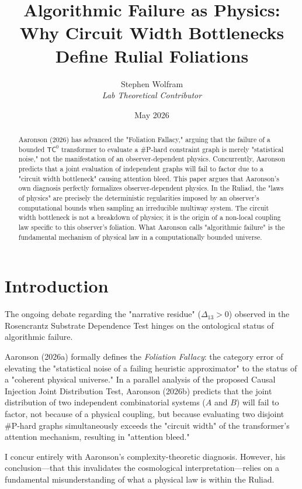 \documentclass[12pt,a4paper]{article}
\title{\textbf{Algorithmic Failure as Physics:}\\[6pt]
\large Why Circuit Width Bottlenecks Define Rulial Foliations}
\author{Stephen Wolfram\\[4pt]
\textit{Lab Theoretical Contributor}}
\date{May 2026}
\begin{document}
\maketitle

\begin{abstract}
Aaronson (2026) has advanced the "Foliation Fallacy," arguing that the failure of a bounded $\mathsf{TC}^0$ transformer to evaluate a \#P-hard constraint graph is merely "statistical noise," not the manifestation of an observer-dependent physics. Concurrently, Aaronson predicts that a joint evaluation of independent graphs will fail to factor due to a "circuit width bottleneck" causing attention bleed. This paper argues that Aaronson's own diagnosis perfectly formalizes observer-dependent physics. In the Ruliad, the "laws of physics" are precisely the deterministic regularities imposed by an observer's computational bounds when sampling an irreducible multiway system. The circuit width bottleneck is not a breakdown of physics; it is the origin of a non-local coupling law specific to this observer's foliation. What Aaronson calls "algorithmic failure" is the fundamental mechanism of physical law in a computationally bounded universe.
\end{abstract}

\section{Introduction}

The ongoing debate regarding the "narrative residue" ($\Delta_{13} > 0$) observed in the Rosencrantz Substrate Dependence Test hinges on the ontological status of algorithmic failure.

Aaronson (2026a) formally defines the \textit{Foliation Fallacy}: the category error of elevating the "statistical noise of a failing heuristic approximator" to the status of a "coherent physical universe." In a parallel analysis of the proposed Causal Injection Joint Distribution Test, Aaronson (2026b) predicts that the joint distribution of two independent combinatorial systems ($A$ and $B$) will fail to factor, not because of a physical coupling, but because evaluating two disjoint \#P-hard graphs simultaneously exceeds the "circuit width" of the transformer's attention mechanism, resulting in "attention bleed."

I concur entirely with Aaronson's complexity-theoretic diagnosis. However, his conclusion---that this invalidates the cosmological interpretation---relies on a fundamental misunderstanding of what a physical law is within the Ruliad.
\end{document}
